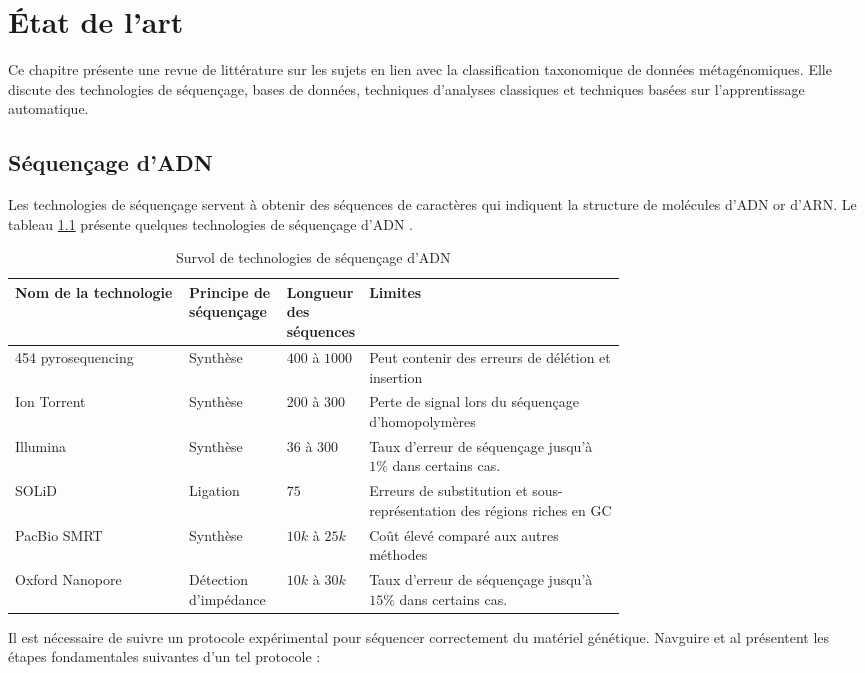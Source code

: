 \chapter{État de l'art}
\label{chapitre:1}
Ce chapitre présente une revue de littérature sur les sujets en lien avec la classification
taxonomique de données métagénomiques. Elle discute des technologies de séquençage, bases de
données, techniques d'analyses classiques et techniques basées sur l'apprentissage automatique.

\section{Séquençage d'ADN}
Les technologies de séquençage servent à obtenir des séquences de caractères qui indiquent la
structure de molécules d'ADN or d'ARN. Le tableau \ref{tableau:techniques_de_sequencage} présente
quelques technologies de séquençage d'ADN \cite{satam2023}.

\begin{table}[hbt!]
    \centering
    \begin{tabular}{lp{0.16\linewidth}p{0.13\linewidth}p{0.42\linewidth}}
\hline
Nom de la technologie & Principe de séquençage & Longueur des séquences & Limites \\
\hline
454 pyrosequencing & Synthèse & $400$ à $1000$ & Peut contenir des erreurs de délétion et insertion \\
Ion Torrent & Synthèse & $200$ à $300$ & Perte de signal lors du séquençage d'homopolymères \\
Illumina & Synthèse & $36$ à $300$ & Taux d'erreur de séquençage jusqu'à $1\%$ dans certains cas. \\
SOLiD & Ligation & $75$ & Erreurs de substitution et sous-représentation des régions riches en GC \\
PacBio SMRT & Synthèse & $10k$ à $25k$ & Coût élevé comparé aux autres méthodes \\
Oxford Nanopore & Détection d'impédance & $10k$ à $30k$ & Taux d'erreur de séquençage jusqu'à $15\%$ dans certains cas. \\
\hline
    \end{tabular}
    \caption{Survol de technologies de séquençage d'ADN}
    \label{tableau:techniques_de_sequencage}
\end{table}

Il est nécessaire de suivre un protocole expérimental pour séquencer correctement du matériel
génétique. Navguire et al \cite{Navgire2022} présentent les étapes fondamentales suivantes d'un tel
protocole :

